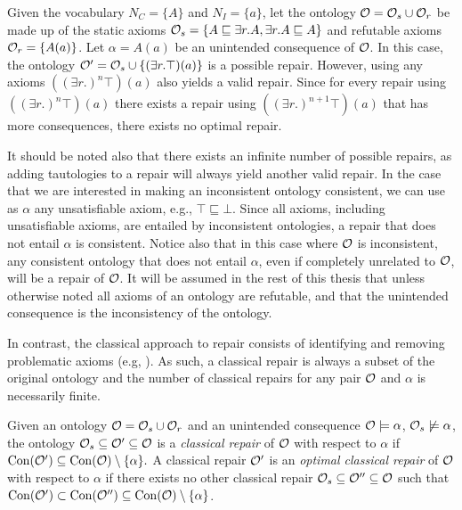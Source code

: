 \begin{example}\label{ex:no-optimal}
Given the vocabulary $N_C = \{ A \}$ and $N_I = \{ a \}$, let the ontology $\mathcal{O} = \mathcal{O}_s \cup \mathcal{O}_r$ be made up of the static axioms $\mathcal{O}_s = \{ A \sqsubseteq \exists r.A, \exists r.A \sqsubseteq A \}$ and refutable axioms $\mathcal{O}_r = \{ A(a) \}$. Let $\alpha = A(a)$ be an unintended consequence of $\mathcal{O}$. In this case, the ontology $\mathcal{O}' = \mathcal{O}_s \cup \{ (\exists r.\top) (a) \}$ is a possible repair. However, using any axioms $((\exists r.)^n\top) (a)$ also yields a valid repair. Since for every repair using $((\exists r.)^n\top) (a)$ there exists a repair using $((\exists r.)^{n + 1}\top) (a)$ that has more consequences, there exists no optimal repair.
\end{example}

It should be noted also that there exists an infinite number of possible repairs, as adding tautologies to a repair will always yield another valid repair. In the case that we are interested in making an inconsistent ontology consistent, we can use as $\alpha$ any unsatisfiable axiom, e.g., $\top \sqsubseteq \bot$. Since all axioms, including unsatisfiable axioms, are entailed by inconsistent ontologies, a repair that does not entail $\alpha$ is consistent. Notice also that in this case where $\mathcal{O}$ is inconsistent, any consistent ontology that does not entail $\alpha$, even if completely unrelated to $\mathcal{O}$, will be a repair of $\mathcal{O}$. It will be assumed in the rest of this thesis that unless otherwise noted all axioms of an ontology are refutable, and that the unintended consequence is the inconsistency of the ontology.

In contrast, the classical approach to repair consists of identifying and removing problematic axioms (e.g, \cite{schlobach2003non,kalyanpur2005debugging,kalyanpur2006repairing,BaPS07}). As such, a classical repair is always a subset of the original ontology and the number of classical repairs for any pair $\mathcal{O}$ and $\alpha$ is necessarily finite.

\begin{definition}
Given an ontology $\mathcal{O} = \mathcal{O}_s \cup \mathcal{O}_r$ and an unintended consequence $\mathcal{O} \models \alpha$, $\mathcal{O}_s \not\models \alpha$, the ontology $\mathcal{O}_s \subseteq \mathcal{O}' \subseteq \mathcal{O}$ is a \emph{classical repair} of $\mathcal{O}$ with respect to $\alpha$ if $\mathrm{Con}(\mathcal{O}') \subseteq \mathrm{Con}(\mathcal{O}) \setminus \{\alpha\}.$ A classical repair $\mathcal{O}'$ is an \emph{optimal classical repair} of $\mathcal{O}$ with respect to $\alpha$ if there exists no other classical repair $\mathcal{O}_s \subseteq \mathcal{O}'' \subseteq \mathcal{O}$ such that $\mathrm{Con}(\mathcal{O}') \subset \mathrm{Con}(\mathcal{O}'') \subseteq \mathrm{Con}(\mathcal{O}) \setminus \{\alpha\}$.
\end{definition}

